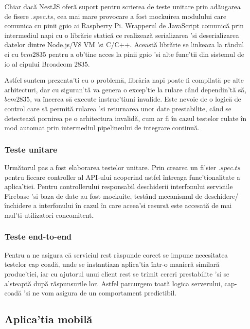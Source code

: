 Chiar dacă NestJS oferă suport pentru scrierea de teste unitare prin adăugarea de fisere $.spec.ts$, cea mai mare provocare a fost mockuirea modulului care comunica cu pinii \acrshort{gpio} ai Raspberry Pi. Wrapperul de JavaScript comunică prin intermediul \acrfull{napi} cu o librărie statică ce realizează serializarea 'si deserializarea datelor dintre Node.js/V8 VM 'si C/C++. Această librărie se linkeaza la rândul ei cu $bcm2835$ pentru a ob'tine acces la pinii \acrshort{gpio} 'si alte func'tii din sistemul de \acrfull{io} al cipului Broadcom 2835.

Astfel suntem prezenta'ti cu o problemă, librăria \acrshort{napi} poate fi compilată pe alte arhitecturi, dar cu siguran'tă va genera o excep'tie la rulare când dependin'tă să, $bcm2835$, va încerca să execute instruc'tiuni invalide. Este nevoie de o logică de control care să permită rularea 'si returnarea unor date prestabilite, când se detectează pornirea pe o arhitectura invalidă, cum ar fi în cazul testelor rulate în mod automat prin intermediul pipelineului de integrare continuă.

\subsubsection {Teste unitare}

Următorul pas a fost elaborarea testelor unitare. Prin crearea un fi'sier $.spec.ts$ pentru fiecare controller al API-ului acoperind astfel întreaga func'tionalitate a aplica'tiei. Pentru controllerului responsabil deschiderii interfonului serviciile Firebase 'si baza de date au fost mockuite, testând mecanismul de deschidere/închidere a interfonului în cazul în care aceea'si resursă este accesată de mai mul'ti utilizatori concomitent.

\subsubsection {Teste end-to-end}

Pentru a ne asigura că serviciul \acrshort{rest} răspunde corect se impune necesitatea testelor cap coadă, unde se instantiaza aplica'tia într-o manieră similară produc'tiei, iar cu ajutorul unui client rest se trimit cereri prestabilite 'si se a'steaptă după răspunsurile lor. Astfel parcurgem toată logica serverului, cap-coadă 'si ne vom asigura de un comportament predictibil.

\subsection {Aplica'tia mobilă}

